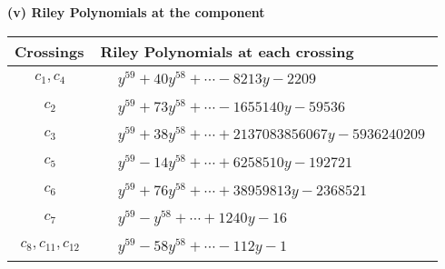 \documentclass[1p]{elsarticle_modified}
\theoremstyle{definition}
\begin{document}
\newpage\renewcommand{\arraystretch}{1}
\flushleft \textbf{(v) Riley Polynomials at the component}\newline \\
\begin{tabular}{m{50pt}|m{274pt}}
Crossings & \hspace{64pt}Riley Polynomials at each crossing \\
\hline $$\begin{aligned}c_{1},c_{4}\end{aligned}$$&$\begin{aligned}
&y^{59}+40 y^{58}+\cdots-8213 y-2209
\end{aligned}$\\
\hline $$\begin{aligned}c_{2}\end{aligned}$$&$\begin{aligned}
&y^{59}+73 y^{58}+\cdots-1655140 y-59536
\end{aligned}$\\
\hline $$\begin{aligned}c_{3}\end{aligned}$$&$\begin{aligned}
&y^{59}+38 y^{58}+\cdots+2137083856067 y-5936240209
\end{aligned}$\\
\hline $$\begin{aligned}c_{5}\end{aligned}$$&$\begin{aligned}
&y^{59}-14 y^{58}+\cdots+6258510 y-192721
\end{aligned}$\\
\hline $$\begin{aligned}c_{6}\end{aligned}$$&$\begin{aligned}
&y^{59}+76 y^{58}+\cdots+38959813 y-2368521
\end{aligned}$\\
\hline $$\begin{aligned}c_{7}\end{aligned}$$&$\begin{aligned}
&y^{59}- y^{58}+\cdots+1240 y-16
\end{aligned}$\\
\hline $$\begin{aligned}c_{8},c_{11},c_{12}\end{aligned}$$&$\begin{aligned}
&y^{59}-58 y^{58}+\cdots-112 y-1
\end{aligned}$\\

\end{tabular}
\end{document}
